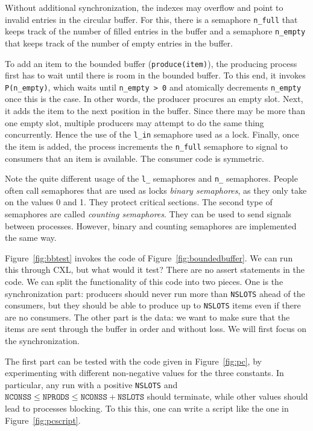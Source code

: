 \documentclass{report}
\begin{document}
Without additional synchronization, the indexes may overflow and point to invalid
entries in the circular buffer.
For this, there is a semaphore \texttt{n\_full} that
keeps track of the number of filled entries in the buffer and a semaphore
\texttt{n\_empty} that keeps track of the number of empty entries in the buffer.

To add an item to the bounded buffer (\texttt{produce(item)}), the producing
process first has to wait until there is room in the bounded buffer.
To this end, it invokes \texttt{P(n\_empty)}, which waits until
\texttt{n\_empty > 0} and atomically decrements \texttt{n\_empty} once this
is the case.  In other words, the producer procures an empty slot.
Next, it adds the item to the next position in the buffer.
Since there may be more than one empty slot, multiple producers may attempt
to do the same thing concurrently.  Hence the use of the \texttt{l\_in}
semaphore used as a lock.  Finally, once the item is added, the process
increments the \texttt{n\_full} semaphore to signal to consumers that
an item is available.
The consumer code is symmetric.

Note the quite different usage of the \texttt{l\_} semaphores and \texttt{n\_}
semaphores.
People often call semaphores that are used as locks \emph{binary semaphores},
as they only take on the values 0 and 1.
They protect critical sections.
The second type of semaphores are called \emph{counting semaphores}.
They can be used to send signals between processes.
However, binary and counting semaphores are implemented the same way.

Figure~\ref{fig:bbtest} invokes the code of Figure~\ref{fig:boundedbuffer}.
We can run this through CXL, but what would it test?  There are no
assert statements in the code.
We can split the functionality of this code into two pieces.  One is
the synchronization part: producers should never run more than \texttt{NSLOTS}
ahead of the consumers, but they should be able to produce up to \texttt{NSLOTS}
items even if there are no consumers.  The other part is the data: we want
to make sure that the items are sent through the buffer in order and without
loss.  We will first focus on the synchronization.

The first part can be tested with the code given in Figure~\ref{fig:pc}, by
experimenting with different non-negative values for the three constants.
In particular, any run with a positive \texttt{NSLOTS} and
$\mathtt{NCONSS} \le \mathtt{NPRODS} \le \mathtt{NCONSS} + \mathtt{NSLOTS}$
should terminate, while other values should lead to processes blocking.
To this this, one can write a script like the one in Figure~\ref{fig:pcscript}.
\end{document}
